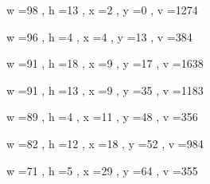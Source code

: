 \documentclass[11pt]{article}
\begin{document}
w =98 , h =13 , x =2 , y =0 , v =1274
\par
w =96 , h =4 , x =4 , y =13 , v =384
\par
w =91 , h =18 , x =9 , y =17 , v =1638
\par
w =91 , h =13 , x =9 , y =35 , v =1183
\par
w =89 , h =4 , x =11 , y =48 , v =356
\par
w =82 , h =12 , x =18 , y =52 , v =984
\par
w =71 , h =5 , x =29 , y =64 , v =355
\par
\newpage
\end{document}
